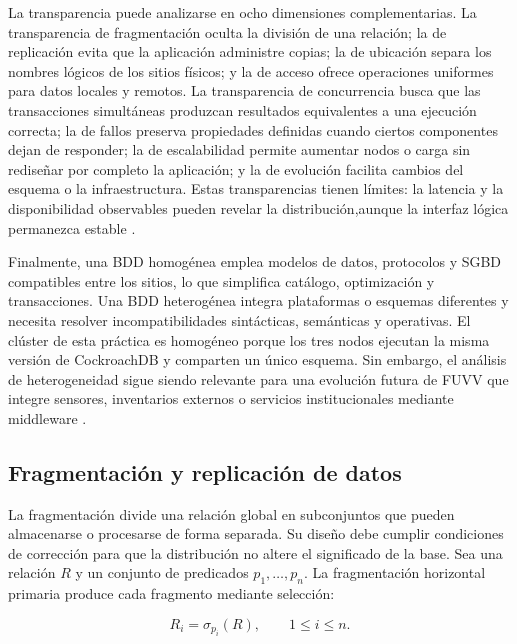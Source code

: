 \documentclass[12pt,a4paper]{article}
\begin{document}
La transparencia puede analizarse en ocho dimensiones complementarias. La transparencia de fragmentación oculta la división de una relación; la de replicación evita que la aplicación administre copias; la de ubicación separa los nombres lógicos de los sitios físicos; y la de acceso ofrece operaciones uniformes para datos locales y remotos. La transparencia de concurrencia busca que las transacciones simultáneas produzcan resultados equivalentes a una ejecución correcta; la de fallos preserva propiedades definidas cuando ciertos componentes dejan de responder; la de escalabilidad permite aumentar nodos o carga sin rediseñar por completo la aplicación; y la de evolución facilita cambios del esquema o la infraestructura. Estas transparencias tienen límites: la latencia y la disponibilidad observables pueden revelar la distribución,aunque la interfaz lógica permanezca estable \cite{kleppmann2017ddia,vansteen2023distributed}.

Finalmente, una BDD homogénea emplea modelos de datos, protocolos y SGBD compatibles entre los sitios, lo que simplifica catálogo, optimización y transacciones. Una BDD heterogénea integra plataformas o esquemas diferentes y necesita resolver incompatibilidades sintácticas, semánticas y operativas. El clúster de esta práctica es homogéneo porque los tres nodos ejecutan la misma versión de CockroachDB y comparten un único esquema. Sin embargo, el análisis de heterogeneidad sigue siendo relevante para una evolución futura de FUVV que integre sensores, inventarios externos o servicios institucionales mediante middleware \cite{ozsu2020distributed,abdalla2023rddbs}.

\subsection{Fragmentación y replicación de datos}
\label{subsec:fragmentacion-replicacion}

La fragmentación divide una relación global en subconjuntos que pueden almacenarse o procesarse de forma separada. Su diseño debe cumplir condiciones de corrección para que la distribución no altere el significado de la base. Sea una relación $R$ y un conjunto de predicados $p_1,\ldots,p_n$. La fragmentación horizontal primaria produce cada fragmento mediante selección:

\begin{equation}
  R_i = \sigma_{p_i}(R), \qquad 1 \leq i \leq n.
  \label{eq:fragmentacion-horizontal}
\end{equation}
\end{document}

